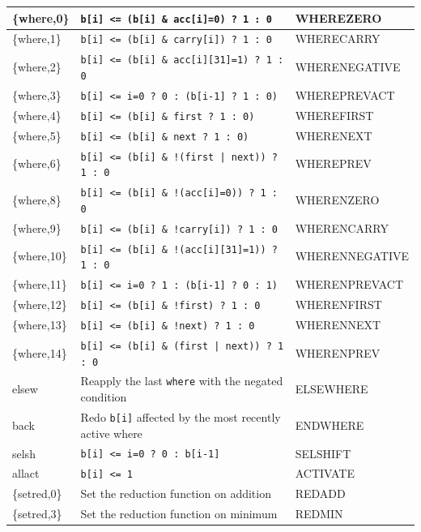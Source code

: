\begin{table}[H]
\begin{longtable}{|l|l|l|}
\{where,0\}   & \texttt{b[i] <= (b[i] \& acc[i]=0) ? 1 : 0}       & WHEREZERO      \\ \hline
\{where,1\}   & \texttt{b[i] <= (b[i] \& carry[i]) ? 1 : 0}       & WHERECARRY     \\ \hline
\{where,2\}   & \texttt{b[i] <= (b[i] \& acc[i][31]=1) ? 1 : 0}   & WHERENEGATIVE  \\ \hline
\{where,3\}   & \texttt{b[i] <= i=0 ? 0 : (b[i-1] ? 1 : 0)}       & WHEREPREVACT   \\ \hline
\{where,4\}   & \texttt{b[i] <= (b[i] \& first ? 1 : 0)}          & WHEREFIRST     \\ \hline
\{where,5\}   & \texttt{b[i] <= (b[i] \& next ? 1 : 0)}           & WHERENEXT      \\ \hline
\{where,6\}   & \texttt{b[i] <= (b[i] \& !(first | next)) ? 1 : 0} & WHEREPREV      \\ \hline
\{where,8\}   & \texttt{b[i] <= (b[i] \& !(acc[i]=0)) ? 1 : 0}    & WHERENZERO     \\ \hline
\{where,9\}   & \texttt{b[i] <= (b[i] \& !carry[i]) ? 1 : 0}      & WHERENCARRY    \\ \hline
\{where,10\}  & \texttt{b[i] <= (b[i] \& !(acc[i][31]=1)) ? 1 : 0} & WHERENNEGATIVE \\ \hline
\{where,11\}  & \texttt{b[i] <= i=0 ? 1 : (b[i-1] ? 0 : 1)}       & WHERENPREVACT  \\ \hline
\{where,12\}  & \texttt{b[i] <= (b[i] \& !first) ? 1 : 0}         & WHERENFIRST    \\ \hline
\{where,13\}  & \texttt{b[i] <= (b[i] \& !next) ? 1 : 0}          & WHERENNEXT     \\ \hline
\{where,14\}  & \texttt{b[i] <= (b[i] \& (first | next)) ? 1 : 0} & WHERENPREV     \\ \hline
elsew         & Reapply the last \texttt{where} with the negated condition & ELSEWHERE     \\ \hline
back          & Redo \texttt{b[i]} affected by the most recently active where & ENDWHERE     \\ \hline
selsh         & \texttt{b[i] <= i=0 ? 0 : b[i-1]}                 & SELSHIFT       \\ \hline
allact        & \texttt{b[i] <= 1}                                & ACTIVATE       \\ \hline
\{setred,0\}  & Set the reduction function on addition            & REDADD         \\ \hline
\{setred,3\}  & Set the reduction function on minimum             & REDMIN         \\ \hline

\end{longtable}
\end{table}
